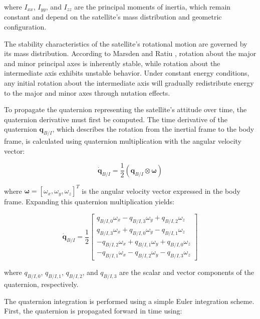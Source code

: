 \noindent where $I_{xx}$, $I_{yy}$, and $I_{zz}$ are the principal moments of inertia, which remain constant and 
depend on the satellite's mass distribution and geometric configuration. 

The stability characteristics of the satellite's rotational 
motion are governed by its mass distribution. According to Marsden and Ratiu , rotation about the major and minor principal 
axes is inherently stable, while rotation about the intermediate axis exhibits unstable behavior. Under constant energy conditions, any 
initial rotation about the intermediate axis will gradually redistribute energy to the major and minor axes through nutation effects.

To propagate the quaternion representing the satellite's attitude over time, the quaternion derivative must first be computed.
 The time derivative of the quaternion $\mathbf{q}_{B/I}$, which describes the rotation from the inertial frame to the body frame,
is calculated using quaternion multiplication with the angular velocity vector:

\begin{equation}
\dot{\mathbf{q}}_{B/I} = \frac{1}{2}(\mathbf{q}_{B/I} \otimes \boldsymbol{\omega})
\end{equation}

\noindent where $\boldsymbol{\omega} = [\omega_x, \omega_y, \omega_z]^T$ is the angular velocity vector expressed in the body frame. 
Expanding this quaternion multiplication yields:

\begin{equation}
\dot{\mathbf{q}}_{B/I} = \frac{1}{2}
\begin{bmatrix}
q_{B/I,0} \omega_x - q_{B/I,3} \omega_y + q_{B/I,2} \omega_z \\
q_{B/I,3} \omega_x + q_{B/I,0} \omega_y - q_{B/I,1} \omega_z \\
-q_{B/I,2} \omega_x + q_{B/I,1} \omega_y + q_{B/I,0} \omega_z \\
-q_{B/I,1} \omega_x - q_{B/I,2} \omega_y - q_{B/I,3} \omega_z
\end{bmatrix}
\end{equation}

\noindent where $q_{B/I,0}$, $q_{B/I,1}$, $q_{B/I,2}$, and $q_{B/I,3}$ are the scalar and vector components of the quaternion, respectively.

The quaternion integration is performed using a simple Euler integration scheme. First, the quaternion is propagated forward in time using:

